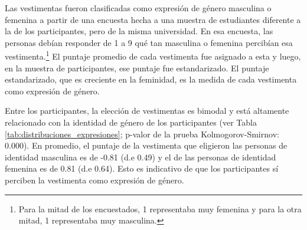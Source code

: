 Las vestimentas fueron clasificadas como expresión de género masculina o femenina a partir de una encuesta hecha a una muestra de estudiantes diferente a la de los participantes, pero de la misma universidad. En esa encuesta, las personas debían responder de 1 a 9 qué tan masculina o femenina percibían esa vestimenta.\footnote{Para la mitad de los encuestados, 1 representaba muy femenina y para la otra mitad, 1 representaba muy masculina.} El puntaje promedio de cada vestimenta fue asignado a esta y luego, en la muestra de participantes, ese puntaje fue estandarizado. El puntaje estandarizado, que es creciente en la feminidad, es la medida de cada vestimenta como expresión de género. 

Entre los participantes, la elección de vestimentas es bimodal y está altamente relacionado con la identidad de género de los participantes (ver Tabla \ref{tab:distribuciones_expresiones}; p-valor de la prueba Kolmogorov-Smirnov: 0.000). En promedio, el puntaje de la vestimenta que eligieron las personas de identidad masculina es de -0.81 (d.e 0.49) y el de las personas de identidad femenina es de 0.81 (d.e 0.64). Esto es indicativo de que los participantes sí perciben la vestimenta como expresión de género. 

